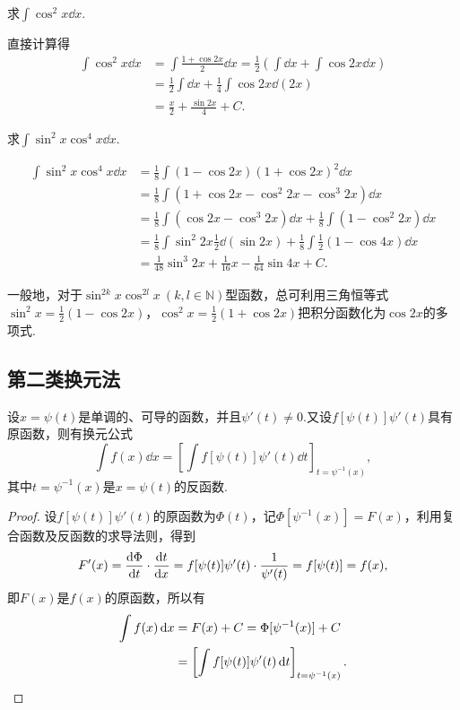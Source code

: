 \begin{example}
求\(\int \cos^2 x \dd{x}\).
\begin{solution}
直接计算得
\begin{align*}
	\int \cos^2 x \dd{x}
	&= \int \frac{1 + \cos 2x}{2} \dd{x}
	= \frac{1}{2} \left( \int \dd{x} + \int \cos 2x \dd{x} \right) \\
	&= \frac{1}{2} \int \dd{x} + \frac{1}{4} \int \cos 2x \dd(2x) \\
	&= \frac{x}{2} + \frac{\sin 2x}{4} + C.
\end{align*}
\end{solution}
\end{example}

\begin{example}
求\(\int \sin^2 x \cos^4 x \dd{x}\).
\begin{solution}
\begin{align*}
\int \sin^2 x \cos^4 x \dd{x}
&= \frac{1}{8} \int (1 - \cos 2x) (1 + \cos 2x)^2 \dd{x} \\
&= \frac{1}{8} \int (1 + \cos 2x - \cos^2 2x - \cos^3 2x) \dd{x} \\
&= \frac{1}{8} \int (\cos 2x - \cos^3 2x) \dd{x}
	+ \frac{1}{8} \int (1 - \cos^2 2x) \dd{x} \\
&= \frac{1}{8} \int \sin^2 2x \frac{1}{2} \dd(\sin 2x)
	+ \frac{1}{8} \int \frac{1}{2} (1 - \cos 4x) \dd{x} \\
&= \frac{1}{48} \sin^3 2x + \frac{1}{16} x - \frac{1}{64} \sin 4x + C.
\end{align*}
\end{solution}
\end{example}

一般地，对于\(\sin^{2k} x \cos^{2l} x\ (k,l\in\mathbb{N})\)型函数，总可利用三角恒等式\(\sin^2 x = \frac{1}{2} (1 - \cos 2x)\)，\(\cos^2 x = \frac{1}{2} (1 + \cos 2x)\)把积分函数化为\(\cos 2x\)的多项式.

\subsection{第二类换元法}

\begin{theorem}
设\(x = \psi(t)\)是单调的、可导的函数，并且\(\psi'(t) \neq 0\).又设\(f[\psi(t)] \psi'(t)\)具有原函数，则有换元公式\[
\int f(x) \dd{x} = \left[ \int f[\psi(t)] \psi'(t) \dd{t} \right]_{t=\psi^{-1}(x)},
\]其中\(t=\psi^{-1}(x)\)是\(x=\psi(t)\)的反函数.
\begin{proof}
设\(f[\psi(t)] \psi'(t)\)的原函数为\(\Phi(t)\)，记\(\Phi[\psi^{-1}(x)] = F(x)\)，利用复合函数及反函数的求导法则，得到\[
F'(x) = \dv{\Phi}{t} \cdot \dv{t}{x}
= f[\psi(t)] \psi'(t) \cdot \frac{1}{\psi'(t)}
= f[\psi(t)] = f(x),
\]即\(F(x)\)是\(f(x)\)的原函数，所以有\begin{align*}
\int f(x) \dd{x} &= F(x) + C
= \Phi[\psi^{-1}(x)] + C \\
&= \left[ \int f[\psi(t)] \psi'(t) \dd{t} \right]_{t=\psi^{-1}(x)}.
\qedhere
\end{align*}
\end{proof}
\end{theorem}

